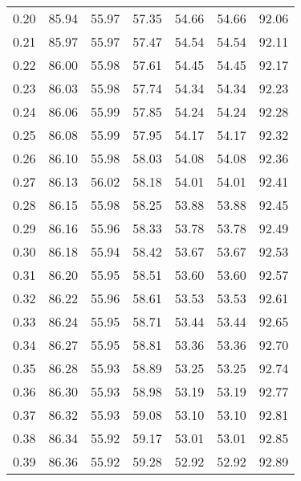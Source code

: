 \begin{tabular}{|c|c|c|c|c|c|c|}
      0.20 &     85.94 &     55.97 &      57.35 &   54.66 &      54.66 &         92.06 \\
      0.21 &     85.97 &     55.97 &      57.47 &   54.54 &      54.54 &         92.11 \\
      0.22 &     86.00 &     55.98 &      57.61 &   54.45 &      54.45 &         92.17 \\
      0.23 &     86.03 &     55.98 &      57.74 &   54.34 &      54.34 &         92.23 \\
      0.24 &     86.06 &     55.99 &      57.85 &   54.24 &      54.24 &         92.28 \\
      0.25 &     86.08 &     55.99 &      57.95 &   54.17 &      54.17 &         92.32 \\
      0.26 &     86.10 &     55.98 &      58.03 &   54.08 &      54.08 &         92.36 \\
      0.27 &     86.13 &     56.02 &      58.18 &   54.01 &      54.01 &         92.41 \\
      0.28 &     86.15 &     55.98 &      58.25 &   53.88 &      53.88 &         92.45 \\
      0.29 &     86.16 &     55.96 &      58.33 &   53.78 &      53.78 &         92.49 \\
      0.30 &     86.18 &     55.94 &      58.42 &   53.67 &      53.67 &         92.53 \\
      0.31 &     86.20 &     55.95 &      58.51 &   53.60 &      53.60 &         92.57 \\
      0.32 &     86.22 &     55.96 &      58.61 &   53.53 &      53.53 &         92.61 \\
      0.33 &     86.24 &     55.95 &      58.71 &   53.44 &      53.44 &         92.65 \\
      0.34 &     86.27 &     55.95 &      58.81 &   53.36 &      53.36 &         92.70 \\
      0.35 &     86.28 &     55.93 &      58.89 &   53.25 &      53.25 &         92.74 \\
      0.36 &     86.30 &     55.93 &      58.98 &   53.19 &      53.19 &         92.77 \\
      0.37 &     86.32 &     55.93 &      59.08 &   53.10 &      53.10 &         92.81 \\
      0.38 &     86.34 &     55.92 &      59.17 &   53.01 &      53.01 &         92.85 \\
      0.39 &     86.36 &     55.92 &      59.28 &   52.92 &      52.92 &         92.89 \\

\end{tabular}
